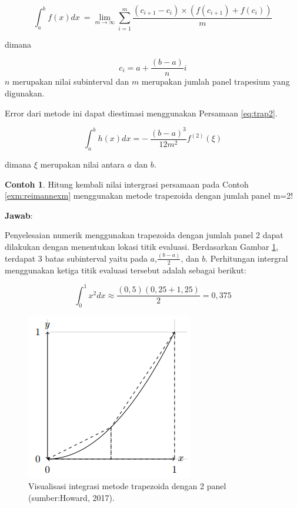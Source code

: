 \documentclass[
]{book}
\theoremstyle{definition}
\theoremstyle{definition}
\newtheorem{example}{Contoh}[chapter]
\theoremstyle{definition}
\theoremstyle{definition}
\theoremstyle{remark}
\begin{document}
\begin{equation}
\int_a^bf\left(x\right)dx\ = \lim\limits_{m \to \infty} \sum_{i=1}^m\frac{\left(c_{i+1}-c_i\right)\times\left(f\left(c_{i+1}\right)+f\left(c_i\right)\right)}{m}
  \label{eq:trap}
\end{equation}

dimana

\[
c_i=a+\frac{\left(b-a\right)}{n}i
\]
\(n\) merupakan nilai subinterval dan \(m\) merupakan jumlah panel trapesium yang digunakan.

Error dari metode ini dapat diestimasi menggunakan Persamaan \eqref{eq:trap2}.

\begin{equation}
\int_a^bh\left(x\right)dx=-\ \frac{\left(b-a\right)^3}{12m^2}f^{\left(2\right)}\left(\xi\right)
  \label{eq:trap2}
\end{equation}

dimana \(\xi\) merupakan nilai antara \(a\) dan \(b\).

\begin{example}
\protect\hypertarget{exm:trapnexm}{}\label{exm:trapnexm}Hitung kembali nilai intergrasi persamaan pada Contoh \ref{exm:reimannexm} menggunakan metode trapezoida dengan jumlah panel m=2!
\end{example}

\textbf{Jawab}:

Penyelesaian numerik menggunakan trapezoida dengan jumlah panel 2 dapat dilakukan dengan menentukan lokasi titik evaluasi. Berdasarkan Gambar \ref{fig:trapviz2}, terdapat 3 batas subinterval yaitu pada \(a\),\(\frac{\left(b-a\right)}{2}\), dan \(b\). Perhitungan intergral menggunakan ketiga titik evaluasi tersebut adalah sebagai berikut:

\[
\int_0^1 x^2 dx \approx \frac{\left(0,5\right)\left(0,25+1,25\right)}{2}=0,375
\]

\begin{figure}

{\centering \includegraphics[width=0.7\linewidth]{./images/trapviz2} 

}

\caption{Visualisasi integrasi metode trapezoida dengan 2 panel (sumber:Howard, 2017).}\label{fig:trapviz2}
\end{figure}
\end{document}
